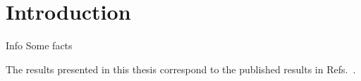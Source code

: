 \chapter{Introduction}

\begin{section}{Info}
Some facts


The results presented in this thesis correspond to the published results in Refs.~\cite{CMS:myTOPRun2,CMS:mySUSRun2PAS,CMS:myTOP2016,CMS:mySUS2016}.

\end{section}
